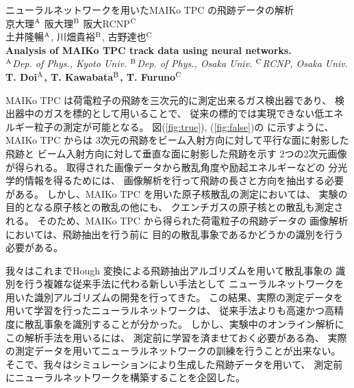\documentclass[12pt,a4paper]{jsarticle}
\begin{document}
\vspace{-5pt}
\begin{center}
  {\gt \Large ニューラルネットワークを用いたMAIKo TPC の飛跡データの解析 }\\[14pt]
  
  {\gt \large 京大理$^{\rm{A}}$ 阪大理$^{\rm{B}}$ 阪大RCNP$^{\rm{C}}$\\
    土井隆暢$^{\rm{A}}$, 川畑貴裕$^{\rm{B}}$, 古野達也$^{\rm{C}}$}\\[5pt]
  
  {\large \bf Analysis of MAIKo TPC track data using neural networks.}\\[5pt]
  
  {\large \it $^{\rm{A}}$Dep. of Phys., Kyoto Univ. $^{\rm{B}}$Dep. of Phys., Osaka Univ.
    $^{\rm{C}}$RCNP, Osaka Univ.}\\
  
  {\large \bf T. Doi$^{\rm{A}}$, T. Kawabata$^{\rm{B}}$, T. Furuno$^{\rm{C}}$}
\end{center}

\vspace{5pt}
\small
MAIKo TPC%
は荷電粒子の飛跡を三次元的に測定出来るガス検出器であり、
検出器中のガスを標的として用いることで、
従来の標的では実現できない低エネルギー粒子の測定が可能となる。
図(\ref{fig:true}), (\ref{fig:false})の%
に示すように、MAIKo TPC からは
3次元の飛跡をビーム入射方向に対して平行な面に射影した飛跡と
ビーム入射方向に対して垂直な面に射影した飛跡を示す
2つの2次元画像が得られる。
取得された画像データから散乱角度や励起エネルギーなどの
分光学的情報を得るためには、
画像解析を行って飛跡の長さと方向を抽出する必要がある。
しかし、MAIKo TPC を用いた原子核散乱の測定においては、
実験の目的となる原子核との散乱の他にも、
クエンチガスの原子核との散乱も測定される。
そのため、MAIKo TPC から得られた荷電粒子の飛跡データの
画像解析においては、飛跡抽出を行う前に
目的の散乱事象であるかどうかの識別を行う必要がある。

我々はこれまでHough 変換による飛跡抽出アルゴリズムを用いて散乱事象の
識別を行う複雑な従来手法に代わる新しい手法として
ニューラルネットワークを用いた識別アルゴリズムの開発を行ってきた。
この結果、実際の測定データを用いて学習を行ったニューラルネットワークは、
従来手法よりも高速かつ高精度に散乱事象を識別することが分かった。
しかし、実験中のオンライン解析にこの解析手法を用いるには、
測定前に学習を済ませておく必要がある為、
実際の測定データを用いてニューラルネットワークの訓練を行うことが出来ない。
そこで、我々はシミュレーションにより生成した飛跡データを用いて、
測定前にニューラルネットワークを構築することを企図した。
\end{document}
